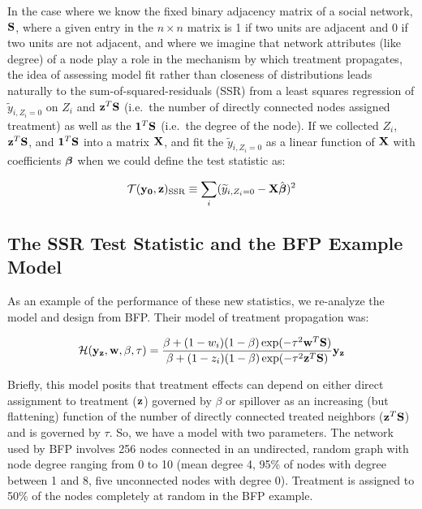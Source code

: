 In the case where we know the fixed binary adjacency matrix of a social
network, $\mathbf{S}$, where a given entry in the $n \times n$ matrix is 1 if two
units are adjacent and 0 if two units are not adjacent, and where we imagine
that network attributes (like degree) of a node play a role in the mechanism
by which treatment propagates, the idea of assessing model fit rather than
closeness of distributions leads naturally to the sum-of-squared-residuals
(SSR) from a least squares regression of $ \widetilde y_{i,Z_i=0}$ on $Z_{i}$
and $\mathbf{z}^{T} \mathbf{S}$ (i.e.\ the number of directly connected nodes assigned
treatment) as well as the $\mathbf{1}^{T} \mathbf{S}$ (i.e.\ the degree of the node).
If we collected $Z_{i}$,$\mathbf{z}^{T} \mathbf{S}$, and $\mathbf{1}^{T} \mathbf{S}$ into a matrix
$\mathbf{X}$, and fit the $\widetilde y_{i,Z_i=0}$ as a linear function of $\mathbf{X}$ with
coefficients $\boldsymbol{\beta}$ when we could define the test statistic as:

\begin{equation}
 \mathcal{T}(\mathbf{y}_{\mathbf{0}},\mathbf{z})_{\text{SSR}} \equiv \sum_{i} ( \widetilde y_{i,Z_i=0} - \mathbf{X}\hat{\boldsymbol{\beta}} )^2 \label{eq:ssr}
\end{equation}


\subsection{The SSR Test Statistic and the BFP Example Model}

As an example of the performance of these new statistics, we re-analyze the
model and design from BFP. Their model of treatment propagation was:

\begin{equation}
\mathcal{H}(\mathbf{y}_{\mathbf{z}}, \mathbf{w}, \beta, \tau) =
 \frac{\beta + (1 - w_i) (1 - \beta) \exp(- \tau^2 \mathbf{w}^{T} \mathbf{S})}
      {\beta + (1 - z_i) (1 - \beta) \exp(- \tau^2 \mathbf{z}^{T} \mathbf{S})} \mathbf{y}_{\mathbf{z}}
\label{eq:spillovermodelA}
\end{equation}

Briefly, this model posits that treatment effects can depend on either direct
assignment to treatment ($\mathbf{z}$) governed by $\beta$ or spillover as an
increasing (but flattening) function of the number of directly connected
treated neighbors ($\mathbf{z}^{T} \mathbf{S}$) and is governed by $\tau$. So, we have a
model with two parameters. The network used by BFP involves 256 nodes
connected in an undirected, random graph with node degree ranging from 0 to 10
(mean degree 4, 95\% of nodes with degree between 1 and 8, five unconnected nodes with
degree 0).  Treatment is assigned to 50\% of the nodes
completely at random in the BFP example.

